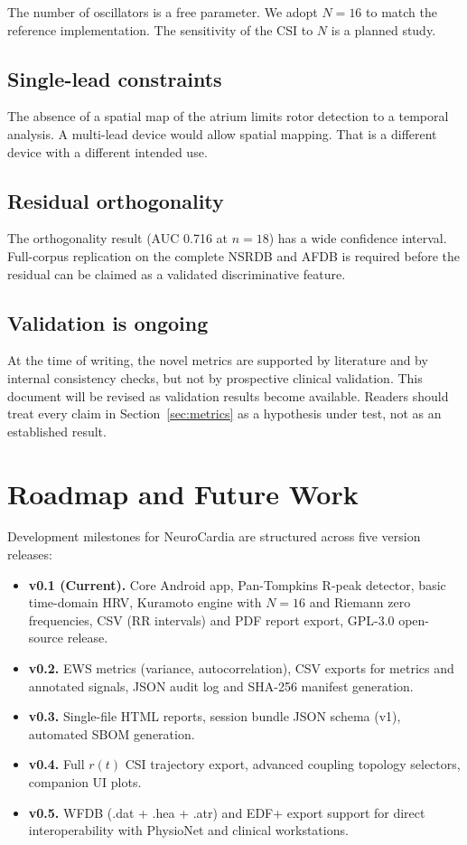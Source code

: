 \documentclass[11pt]{article}
\begin{document}
The number of oscillators is a free parameter. We adopt $N = 16$ to
match the reference implementation. The sensitivity of the CSI to $N$
is a planned study.

\subsection{Single-lead constraints}

The absence of a spatial map of the atrium limits rotor detection to a
temporal analysis. A multi-lead device would allow spatial mapping.
That is a different device with a different intended use.

\subsection{Residual orthogonality}

The orthogonality result (AUC 0.716 at $n = 18$) has a wide confidence
interval. Full-corpus replication on the complete NSRDB and AFDB is
required before the residual can be claimed as a validated
discriminative feature.

\subsection{Validation is ongoing}

At the time of writing, the novel metrics are supported by literature
and by internal consistency checks, but not by prospective clinical
validation. This document will be revised as validation results become
available. Readers should treat every claim in Section~\ref{sec:metrics}
as a hypothesis under test, not as an established result.

\section{Roadmap and Future Work}\label{sec:roadmap}

Development milestones for NeuroCardia are structured across five
version releases:

\begin{itemize}
\item \textbf{v0.1 (Current).} Core Android app, Pan-Tompkins R-peak
detector, basic time-domain HRV, Kuramoto engine with $N = 16$ and
Riemann zero frequencies, CSV (RR intervals) and PDF report export,
GPL-3.0 open-source release.
\item \textbf{v0.2.} EWS metrics (variance, autocorrelation), CSV
exports for metrics and annotated signals, JSON audit log and SHA-256
manifest generation.
\item \textbf{v0.3.} Single-file HTML reports, session bundle JSON
schema (v1), automated SBOM generation.
\item \textbf{v0.4.} Full $r(t)$ CSI trajectory export, advanced
coupling topology selectors, companion UI plots.
\item \textbf{v0.5.} WFDB (.dat + .hea + .atr) and EDF+ export support
for direct interoperability with PhysioNet and clinical workstations.
\end{itemize}
\end{document}
